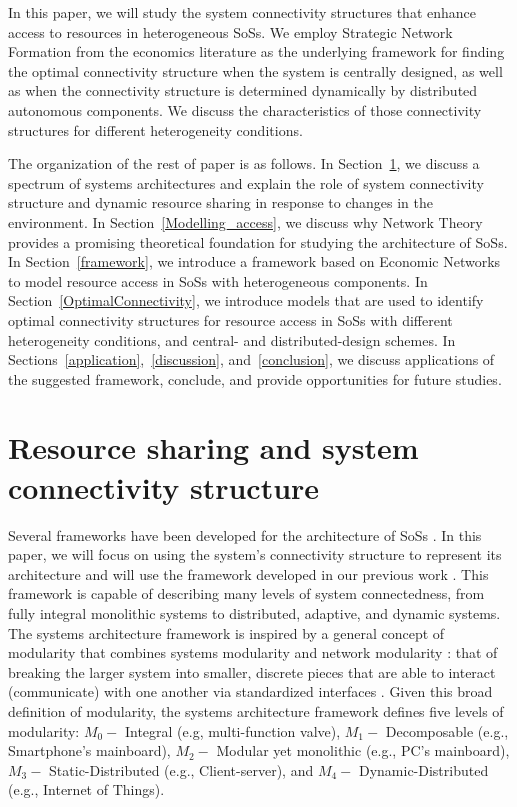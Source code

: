 \documentclass[journal,onecolumn]{IEEEtran}
\theoremstyle{plain}
\begin{document}
In this paper, we will study the system connectivity structures that enhance access to resources in heterogeneous SoSs. We employ Strategic Network Formation from the economics literature as the underlying framework for finding the optimal connectivity structure when the system is centrally designed, as well as when the connectivity structure is determined dynamically by distributed autonomous components. We discuss the characteristics of those connectivity structures for different heterogeneity conditions.  

The organization of the rest of paper is as follows. In Section~\ref{RS_and_Connectivity}, we discuss a spectrum of systems architectures and explain the role of system connectivity structure and dynamic resource sharing in response to changes in the  environment. In Section~\ref{Modelling_access}, we discuss why Network Theory provides a promising theoretical foundation for studying the architecture of SoSs. In Section~\ref{framework}, we introduce a framework based on Economic Networks to model resource access in SoSs with heterogeneous components. In Section~\ref{OptimalConnectivity}, we introduce models that are used to identify optimal connectivity structures for resource access in SoSs with different heterogeneity conditions, and central- and distributed-design schemes. In Sections~\ref{application},~\ref{discussion}, and~\ref{conclusion}, we discuss applications of the suggested framework, conclude, and provide opportunities for future studies.




\section{Resource sharing and system connectivity structure}
\label{RS_and_Connectivity}

Several frameworks have been developed for the architecture of SoSs \citep{maier2009art,rhodes2009architecting,morganwalp2002system}. In this paper, we will focus on using the system's connectivity structure to represent its architecture and will use the framework developed in our previous work \citep{heydari2014,mosleh2015monolithic}. This framework is capable of describing many levels of system connectedness, from fully integral monolithic systems to distributed, adaptive, and dynamic systems. The systems architecture framework is inspired by a general concept of modularity that combines systems modularity \citep{baldwin2000design} and network modularity \citep{newman2006modularity}: that of breaking the larger system into smaller, discrete pieces that are able to interact (communicate) with one another via standardized interfaces \citep{langlois2002modularity}. Given this broad definition of modularity, the systems architecture framework defines five levels of modularity: $M_0-$ Integral (e.g, multi-function valve), $M_1-$ Decomposable (e.g., Smartphone's mainboard), $M_2-$ Modular yet monolithic (e.g., PC's mainboard), $M_3-$ Static-Distributed (e.g., Client-server), and $M_4-$ Dynamic-Distributed (e.g., Internet of Things).
\end{document}
